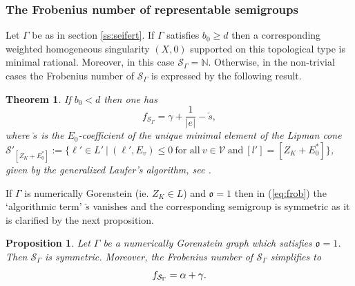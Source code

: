 \documentclass[oneside]{amsart}
\numberwithin{equation}{section}
\numberwithin{equation}{subsection}
\theoremstyle{plain}
\newtheorem{theorem}[equation]{Theorem}
\newtheorem{proposition}[equation]{Proposition}
\theoremstyle{definition}
\newcommand{\calv}{{\mathcal V}}
\newcommand{\calS}{{\mathcal S}}\newcommand{\cals}{{\bf s}}\newcommand{\calst}{{\bf st}}\newcommand{\cS}{{\mathcal S}}
\newcommand{\V}{\calv}\newcommand{\Nd}
\newcommand{\al}{\alpha}
\newcommand{\oo}{\mathfrak{o}}
\begin{document}
\subsubsection{\bf The Frobenius number of representable semigroups}

Let $\Gamma$ be as in section \ref{ss:seifert}. If $\Gamma$ satisfies $b_0\geq d$ then a corresponding weighted homogeneous singularity $(X,0)$ supported on this topological type is minimal rational. Moreover, in this case $\calS_{\Gamma}=\mathbb{N}$. Otherwise, in the non-trivial cases the Frobenius number of $\calS_{\Gamma}$ is expressed by the following result.

\begin{theorem}{\cite{stronglyflat}}
 If $b_0<d$ then one has
 \begin{equation}\label{eq:frob}
 f_{\calS_{\Gamma}}=\gamma + \frac{1}{|e|}-\check{s},
 \end{equation}
 where $\check{s}$ is the $E_0$-coefficient of 
 the unique minimal element of the Lipman cone  $\mathcal{S}'_{[Z_K+E_0^*]}:=\{\ell'\in L' \ | \ (\ell',E_v)\leq 0 \ \mbox{for all} \ v\in \V \ \mbox{and} \ [l']=[Z_K+E_0^*]\}$, given by the generalized Laufer's algorithm, see \cite[3.1.2]{stronglyflat}.
\end{theorem}

If $\Gamma$ is numerically Gorenstein (ie. $Z_K\in L$) and $\mathfrak{o}=1$ then in (\ref{eq:frob}) the `algorithmic term' $\check{s}$ vanishes and the corresponding semigroup is symmetric as it is clarified by the next proposition. 


\begin{proposition} \label{thm_ngor0_sym_and_frob}
    Let $\Gamma$ be a numerically Gorenstein graph which 
    satisfies $\oo=1$. Then 
     $\calS_{\Gamma}$ is symmetric.  
    Moreover, 
    the Frobenius number of $\calS_{\Gamma}$ simplifies to  
    \begin{equation}\label{eq:frobNGoro1}
    f_{\calS_{\Gamma}}=\al+\gamma.
    \end{equation}
\end{proposition}
\end{document}
